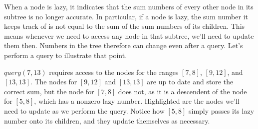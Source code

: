 \documentclass[11pt]{book}
\begin{document}
When a node is lazy, it indicates that the sum numbers of every other node in its subtree is no longer accurate. In particular, if a node is lazy, the sum number it keeps track of is not equal to the sum of the sum numbers of its children. This means whenever we need to access any node in that subtree, we'll need to update them then. Numbers in the tree therefore can change even after a query. Let's perform a query to illustrate that point.

$query(7,13)$ requires access to the nodes for the ranges $[7,8]$, $[9,12]$, and $[13,13]$. The nodes for $[9,12]$ and $[13,13]$ are up to date and store the correct sum, but the node for $[7,8]$ does not, as it is a descendent of the node for $[5,8]$, which has a nonzero lazy number. Highlighted are the nodes we'll need to update as we perform the query. Notice how $[5,8]$ simply passes its lazy number onto its children, and they update themselves as necessary.
\end{document}
